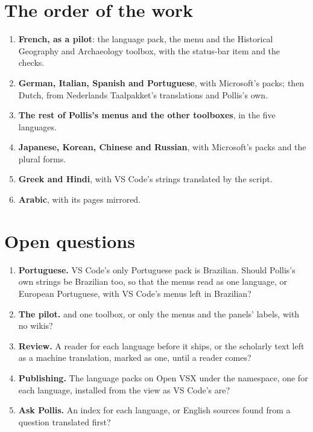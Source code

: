 \section{The order of the work}\label{sec:order}
\begin{enumerate}
  \item \textbf{French, as a pilot}: the language pack, the  menu and the Historical Geography and
    Archaeology toolbox, with the status-bar item and the checks.
  \item \textbf{German, Italian, Spanish and Portuguese}, with Microsoft's packs; then Dutch, from Nederlands
    Taalpakket's translations and Pollis's own.
  \item \textbf{The rest of Pollis's menus and the other toolboxes}, in the five languages.
  \item \textbf{Japanese, Korean, Chinese and Russian}, with Microsoft's packs and the plural forms.
  \item \textbf{Greek and Hindi}, with VS Code's strings translated by the script.
  \item \textbf{Arabic}, with its pages mirrored.
\end{enumerate}

\section{Open questions}\label{sec:questions}
\begin{enumerate}
  \item \textbf{Portuguese.} VS Code's only Portuguese pack is Brazilian. Should Pollis's own strings be Brazilian too,
    so that the menus read as one language, or European Portuguese, with VS Code's menus left in Brazilian?
  \item \textbf{The pilot.}  and one toolbox, or only the menus and the panels' labels, with no wikis?
  \item \textbf{Review.} A reader for each language before it ships, or the scholarly text left as a machine
    translation, marked as one, until a reader comes?
  \item \textbf{Publishing.} The language packs on Open VSX under the  namespace, one for each language,
    installed from the  view as VS Code's are?
  \item \textbf{Ask Pollis.} An index for each language, or English sources found from a question translated first?
\end{enumerate}

